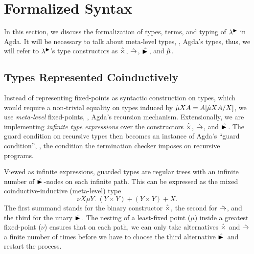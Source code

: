 
\section{Formalized Syntax}
\label{sec:syntax}

In this section, we discuss the formalization of types, terms, and
typing of $\lambda^{\mathord{\blacktriangleright}}$ in Agda.  It will be necessary to talk about
meta-level types, \ie, Agda's types, thus, we will refer to
$\lambda^{\mathord{\blacktriangleright}}$'s type constructors as $\hattimes$, $\hatto$,
$\hatlater$, and $\hatmu$.

\subsection{Types Represented Coinductively}

Instead of representing fixed-points as syntactic construction on
types, which would require a non-trivial equality on types induced by
$\hatmu X A = \subst{\hatmu X A}X A$, we use \emph{meta-level} fixed-points,
\ie, Agda's recursion mechanism.  Extensionally, we are implementing
\emph{infinite type expressions} over the constructors $\hattimes$,
$\hatto$, and $\hatlater$.  The guard condition on recursive types then
becomes an instance of Agda's ``guard condition'', \ie, the condition
the termination checker imposes on recursive programs.

Viewed as infinite expressions, guarded types are regular trees with
an infinite number of $\hatlater$-nodes on each infinite path.  This
can be expressed as the mixed coinductive-inductive (meta-level) type
\[
  \nu X \mu Y.\; (Y \times Y) + (Y \times Y) + X. 
\]
The first summand stands for the binary constructor $\hattimes$, the
second for $\hatto$, and the third for the unary $\hatlater$.  The
nesting of a least-fixed point ($\mu$) inside a greatest fixed-point
($\nu$) ensures that on each path, we can only take alternatives
$\hattimes$ and $\hatto$ a finite number of times before we have to
choose the third alternative $\hatlater$ and restart the process.







